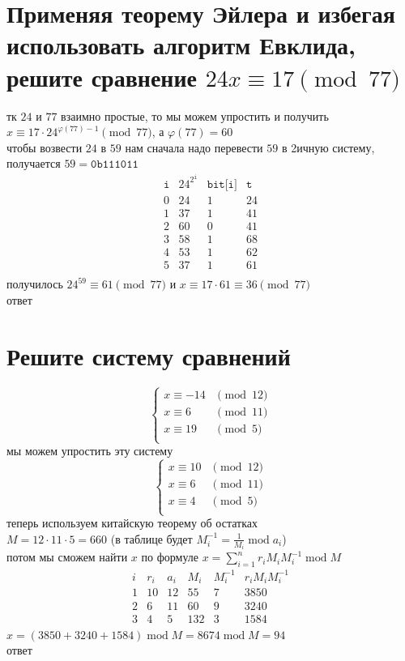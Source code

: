 \documentclass{article}
\newcommand{\ds}{\displaystyle}
\newcommand{\Mod}[1]{\pmod{#1}}
\renewcommand{\mod}{\operatorname{mod}}
\begin{document}
  \section{Применяя теорему Эйлера и избегая использовать алгоритм Евклида, решите сравнение $24x \equiv 17 \Mod{77}$}
  тк $24$ и $77$ взаимно простые, то мы можем упростить и получить $x \equiv 17 \cdot 24^{\varphi(77)-1} \Mod{77}$, а $\varphi(77)=60$ \\
  чтобы возвести $24$ в $59$ нам сначала надо перевести $59$ в 2ичную систему, получается $59=\texttt{0b111011}$
  $$\begin{array}{c|c|c|c}
    \texttt{i} & 24^{2^\texttt{i}} & \texttt{bit[i]} & \texttt{t} \\
    \hline
    0 & 24 & 1 & 24 \\
    1 & 37 & 1 & 41 \\
    2 & 60 & 0 & 41 \\
    3 & 58 & 1 & 68 \\
    4 & 53 & 1 & 62 \\
    5 & 37 & 1 & 61 \\
  \end{array}$$
  получилось $24^{59} \equiv 61 \Mod{77}$ и $x \equiv 17 \cdot 61 \equiv 36 \Mod{77}$ \\
  ответ 

  \section{Решите систему сравнений}
  \[
    \begin{cases}
      x \equiv -14 & \Mod{12} \\
      x \equiv 6 & \Mod{11} \\
      x \equiv 19 & \Mod{5} \\
    \end{cases}
  \]
  мы можем упростить эту систему
  \[
    \begin{cases}
      x \equiv 10 & \Mod{12} \\
      x \equiv 6 & \Mod{11} \\
      x \equiv 4 & \Mod{5} \\
    \end{cases}
  \]
  теперь используем китайскую теорему об остатках \\
  $M = 12 \cdot 11 \cdot 5 = 660$ (в таблице будет $\ds M_i^{-1} = \frac{1}{M_i} \mod a_i$) \\
  потом мы сможем найти $x$ по формуле $\ds x = \sum_{i=1}^n r_i M_i M_i^{-1} \mod M$
  \[
    \begin{array}{c|c|c|c|c|c}
      i & r_i & a_i & M_i & M_i^{-1} & r_i M_i M_i^{-1} \\
      \hline
      1 & 10 & 12 & 55 & 7 & 3850 \\
      2 & 6 & 11 & 60 & 9 & 3240 \\
      3 & 4 & 5 & 132 & 3 & 1584 \\
    \end{array}
  \]
  $x = (3850+3240+1584) \mod M = 8674 \mod M = 94$ \\
  ответ 
\end{document}
